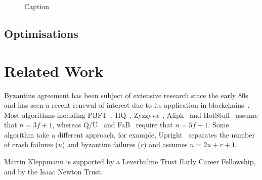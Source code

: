 \documentclass[manuscript]{acmart}
\begin{document}
\begin{figure}
    \centering
    
    \caption{Caption}
    \label{fig:my_label}
\end{figure}

\subsection{Optimisations}\label{sec:optimisations}

\section{Related Work}

Byzantine agreement has been subject of extensive research since the early 80s~\cite{Lamport:1982} and has seen a recent renewal of interest due to its application in blockchains~\cite{Bano:2019}.
Most algorithms including PBFT~\cite{Castro:1999}, HQ~\cite{Cowling:2006}, Zyzzyva~\cite{Kotla:2007}, Aliph~\cite{Aublin:2015} and HotStuff~\cite{Yin:2019} assume that $n=3f+1$, whereas Q/U~\cite{Abd:2005} and FaB~\cite{Martin:2006} require that $n=5f+1$.
Some algorithm take a different approach, for example, Upright~\cite{Clement:2009} separates the number of crash failures ($u$) and byzantine failures ($r$) and assumes $n=2u+r+1$.










\begin{acks}
Martin Kleppmann is supported by a Leverhulme Trust Early Career Fellowship, and by the Isaac Newton Trust.
\end{acks}



\end{document}
